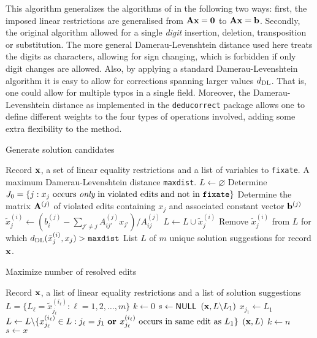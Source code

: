 \documentclass[11pt, fleqn, a4paper]{article}
\begin{document}
This algorithm generalizes the algorithms of \cite{scholtus:2009} in the
following two ways: first, the imposed linear restrictions are generalised from
${\bf Ax=0}$ to $\bf Ax=b$. Secondly, the original algorithm allowed for a single {\em
digit} insertion, deletion, transposition or substitution. The more general
Damerau-Levenshtein distance used here treats the digits as characters,
allowing for sign changing, which is forbidden if only digit changes are
allowed. Also, by applying a standard Damerau-Levenshtein algorithm it is easy
to allow for corrections spanning larger values $d_{\rm DL}$. That is, one
could allow for multiple typos in a single field. Moreover, the
Damerau-Levenshtein distance as implemented in the {\tt deducorrect} package
allows one to define different weights to the four types of operations
involved, adding some extra flexibility to the method.
%
%
\begin{algorithm}[t]
\caption{Generate solution candidates}
\label{generateCandidates}
\begin{algorithmic}[1]
\Require Record $\bf x$, a set of linear equality restrictions and a list of variables to {\tt fixate}. A maximum
Damerau-Levenshtein distance {\tt maxdist}.
\State $L\leftarrow\varnothing$
\State Determine $J_0=\{j: x_j \textrm{ occurs {\em only} in violated edits and not in {\tt fixate}}\}$
\State Determine the matrix ${\bf A}^{(j)}$ of violated edits containing $x_j$ and associated constant vector ${\bf b}^{(j)}$
\State $\tilde{x}_j^{(i)} \leftarrow \left(b_i^{(j)}-\sum_{j'\not=j}A_{ij'}^{(j)}x_{j'}\right)/A_{ij}^{(j)} $
\State $L\leftarrow L\cup\tilde{x}_j^{(i)}$ 
\EndFor
\EndFor
\State Remove $\tilde{x}^{(i)}_j$ from $L$ for which $d_{\rm DL}(\tilde{x}^{(i)}_j,x_j)>{\tt maxdist}$ 
\Ensure List $L$ of $m$ unique solution suggestions for record ${\bf x}$.
\end{algorithmic}
\end{algorithm}
%
\begin{algorithm}[t]
\caption{Maximize number of resolved edits}
\label{maximizeResolvedEdits}
\begin{algorithmic}[1]
\Require Record ${\bf x}$, a list of linear equality restrictions and a list of solution suggestions
$L = \{L_\ell=\tilde{x}^{(i_\ell)}_{j_\ell}:\ell=1,2,\ldots, m\}$
\State $k\leftarrow 0$ 
\State $s\leftarrow {\sf NULL}$
$({\bf x},L\backslash L_1)$
\State $x_{j_1}\leftarrow L_1$ 
\State $L\leftarrow L\backslash \{x^{(i_\ell)}_{j_\ell}\in L: j_\ell=j_1 \textrm{ \bf  or } x^{(i_\ell)}_{j_\ell}\textrm{ occurs in same edit as } L_1\}$
$({\bf x},L)$
\Else
{}
\State $k \leftarrow n$
\State $s \leftarrow x$
\EndIf
\EndIf
\EndProcedure
{}
\end{algorithmic}
\end{algorithm}
\end{document}
